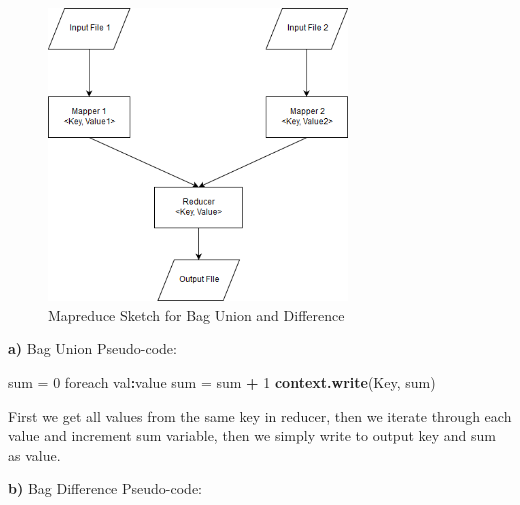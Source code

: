 \documentclass[]{article}
\newenvironment{Shaded}{\begin{snugshade}}{\end{snugshade}}
\newcommand{\DecValTok}[1]{\textcolor[rgb]{0.00,0.00,0.81}{#1}}
\newcommand{\KeywordTok}[1]{\textcolor[rgb]{0.13,0.29,0.53}{\textbf{#1}}}
\newcommand{\NormalTok}[1]{#1}
\newcommand{\OperatorTok}[1]{\textcolor[rgb]{0.81,0.36,0.00}{\textbf{#1}}}
\newcommand{\StringTok}[1]{\textcolor[rgb]{0.31,0.60,0.02}{#1}}
\begin{document}
\begin{figure}[h]

{\centering \includegraphics[width=300px]{images/Exercise3} 

}

\caption{\label{fig:figs}Mapreduce Sketch for Bag Union and Difference}\label{fig:unnamed-chunk-3}
\end{figure}

\textbf{a)} Bag Union Pseudo-code:

\begin{Shaded}
\begin{Highlighting}[]
\NormalTok{sum =}\StringTok{ }\DecValTok{0}
\NormalTok{foreach val}\OperatorTok{:}\NormalTok{value }
\NormalTok{    sum =}\StringTok{ }\NormalTok{sum }\OperatorTok{+}\StringTok{ }\DecValTok{1}
\KeywordTok{context.write}\NormalTok{(Key, sum)}
\end{Highlighting}
\end{Shaded}

First we get all values from the same key in reducer, then we iterate
through each value and increment sum variable, then we simply write to
output key and sum as value.

\textbf{b)} Bag Difference Pseudo-code:
\end{document}
